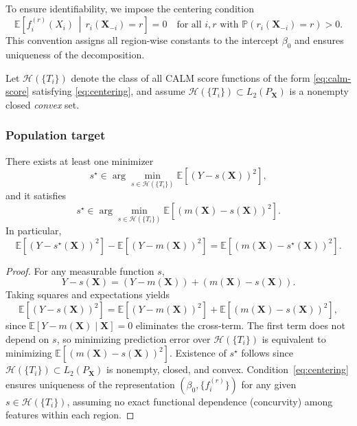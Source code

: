 To ensure identifiability, we impose the centering condition
\begin{equation}
\mathbb{E}\!\left[
f_i^{(r)}(X_i)\,\middle|\, r_i(\mathbf{X}_{-i})=r
\right]=0
\quad
\text{for all } i,r \text{ with } \mathbb{P}(r_i(\mathbf{X}_{-i})=r)>0.
\label{eq:centering}
\end{equation}
This convention assigns all region-wise constants to the intercept $\beta_0$
and ensures uniqueness of the decomposition.

Let $\mathcal H(\{T_i\})$ denote the class of all CALM score functions of the form
\eqref{eq:calm-score} satisfying \eqref{eq:centering}, and assume $\mathcal H(\{T_i\})\subset L_2(P_{\mathbf{X}})$ is a nonempty closed \emph{convex} set.

\subsubsection{Population target}

\begin{proposition}
\label{prop:population}
There exists at least one minimizer
\[
s^\star
\in
\arg\min_{s\in\mathcal H(\{T_i\})}
\mathbb{E}[(Y-s(\mathbf{X}))^2],
\]
and it satisfies
\[
s^\star
\in
\arg\min_{s\in\mathcal H(\{T_i\})}
\mathbb{E}[(m(\mathbf{X})-s(\mathbf{X}))^2].
\]
In particular,
\[
\mathbb{E}[(Y-s^\star(\mathbf{X}))^2]
-
\mathbb{E}[(Y-m(\mathbf{X}))^2]
=
\mathbb{E}[(m(\mathbf{X})-s^\star(\mathbf{X}))^2].
\]
\end{proposition}

\begin{proof}
For any measurable function $s$,
\[
Y-s(\mathbf{X})
=
(Y-m(\mathbf{X}))+(m(\mathbf{X})-s(\mathbf{X})).
\]
Taking squares and expectations yields
\[
\mathbb{E}[(Y-s(\mathbf{X}))^2]
=
\mathbb{E}[(Y-m(\mathbf{X}))^2]
+
\mathbb{E}[(m(\mathbf{X})-s(\mathbf{X}))^2],
\]
since $\mathbb{E}[Y-m(\mathbf{X})\mid \mathbf{X}]=0$ eliminates the cross-term.
The first term does not depend on $s$, so minimizing prediction error over
$\mathcal H(\{T_i\})$ is equivalent to minimizing
$\mathbb{E}[(m(\mathbf{X})-s(\mathbf{X}))^2]$.
Existence of $s^\star$ follows since $\mathcal H(\{T_i\})\subset L_2(P_{\mathbf{X}})$ is nonempty, closed, and convex.
Condition~\eqref{eq:centering} ensures uniqueness of the representation
$(\beta_0,\{f_i^{(r)}\})$ for any given $s\in\mathcal H(\{T_i\})$, assuming no exact functional dependence (concurvity) among features within each region.
\end{proof}

